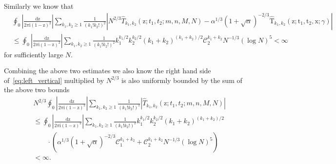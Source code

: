 \documentclass{article}
\numberwithin{equation}{section}
\newcommand{\CC}{\mathcal{C}}
\newcommand{\ddbar}[2]{\frac{{\mathrm d}#1}{2\pi {\mathrm i}#2}}
\begin{document}
Similarly we know that
\begin{equation*}
	\begin{split}
			&\oint_0\left|\ddbar{\mathrm{z}}{\mathrm{(1-z)^2}}\right|\sum_{k_1,k_2\ge 1}
		\frac{1}{(k_1!k_2!)^2}
		\left| N^{2/3}\hat T_{k_1,k_2}(\mathrm{z};t_1,t_2;m,n,M,N)-\alpha^{1/3}(1+\sqrt{\alpha})^{-2/3}\mathrm{\hat T}_{k_1,k_2}(\mathrm{z};\mathrm{t}_1,\mathrm{t}_2,\mathrm{x};\gamma) \right|\\
		&\le \oint_0\left|\ddbar{\mathrm{z}}{\mathrm{(1-z)^2}}\right|\sum_{k_1,k_2\ge 1}
		\frac{1}{(k_1!k_2!)^2} k_1^{k_1/2}k_2^{k_2/2}(k_1+k_2)^{(k_1+k_2)/2}\CC_2^{k_1+k_2} N^{-1/3}(\log N)^5<\infty
	\end{split}
\end{equation*}
for sufficiently large $N$.

 Combining the above two estimates we also know the right hand side of~\eqref{eq:left_vertical} multiplied by $N^{2/3}$ is also uniformly bounded by the sum of the above two bounds
 \begin{equation*}
 	\begin{split}
 		&N^{2/3}\oint_0\left|\ddbar{\mathrm{z}}{\mathrm{(1-z)^2}}\right|\sum_{k_1,k_2\ge 1}
 		\frac{1}{(k_1!k_2!)^2}
 		\left|\hat T_{k_1,k_2}(\mathrm{z};t_1,t_2;m,n,M,N)\right|\\
 		& \le \oint_0\left|\ddbar{\mathrm{z}}{\mathrm{(1-z)^2}}\right|\sum_{k_1,k_2\ge 1}
 		\frac{1}{(k_1!k_2!)^2} k_1^{k_1/2}k_2^{k_2/2}(k_1+k_2)^{(k_1+k_2)/2}\\
 		&\qquad\cdot\left(\alpha^{1/3}(1+\sqrt{\alpha})^{-2/3}\CC_1^{k_1+k_2}+\CC_2^{k_1+k_2}N^{-1/3}(\log N)^5\right)\\
 		&<\infty.
 	\end{split}
 \end{equation*}

 
 
\end{document}
